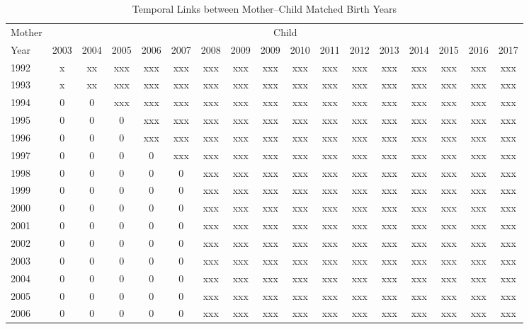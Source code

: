 \documentclass[11pt]{article}
\begin{document}
\begin{spacing}{1.5}
\begin{appendices}
    
  \begin{landscape}
  \begin{table}[htpb!]
    \centering
    \caption{Temporal Links between Mother--Child Matched Birth Years}
    \label{tab:birthChart}
    \begin{tabular}{lcccccccccccccccc} \toprule
    Mother & \multicolumn{16}{c}{Child} \\ \cmidrule(r){2-17}
    Year & 2003 & 2004 & 2005 & 2006 & 2007 & 2008 & 2009 & 2009 & 2010 & 2011 & 2012 & 2013 & 2014 & 2015 & 2016 & 2017 \\ \midrule
    1992 & x & xx & xxx & xxx & xxx & xxx & xxx & xxx & xxx & xxx & xxx & xxx & xxx & xxx & xxx & xxx \\
    1993 & x & xx & xxx & xxx & xxx & xxx & xxx & xxx & xxx & xxx & xxx & xxx & xxx & xxx & xxx & xxx \\
    1994 & 0 & 0  & xxx & xxx & xxx & xxx & xxx & xxx & xxx & xxx & xxx & xxx & xxx & xxx & xxx & xxx \\
    1995 & 0 & 0  & 0   & xxx & xxx & xxx & xxx & xxx & xxx & xxx & xxx & xxx & xxx & xxx & xxx & xxx \\
    1996 & 0 & 0  & 0   & xxx & xxx & xxx & xxx & xxx & xxx & xxx & xxx & xxx & xxx & xxx & xxx & xxx \\
    1997 & 0 & 0  & 0   & 0   & xxx & xxx & xxx & xxx & xxx & xxx & xxx & xxx & xxx & xxx & xxx & xxx \\
    1998 & 0 & 0  & 0   & 0   & 0   & xxx & xxx & xxx & xxx & xxx & xxx & xxx & xxx & xxx & xxx & xxx \\
    1999 & 0 & 0  & 0   & 0   & 0   & xxx & xxx & xxx & xxx & xxx & xxx & xxx & xxx & xxx & xxx & xxx \\
    2000 & 0 & 0  & 0   & 0   & 0   & xxx & xxx & xxx & xxx & xxx & xxx & xxx & xxx & xxx & xxx & xxx \\
    2001 & 0 & 0  & 0   & 0   & 0   & xxx & xxx & xxx & xxx & xxx & xxx & xxx & xxx & xxx & xxx & xxx \\
    2002 & 0 & 0  & 0   & 0   & 0   & xxx & xxx & xxx & xxx & xxx & xxx & xxx & xxx & xxx & xxx & xxx \\
    2003 & 0 & 0  & 0   & 0   & 0   & xxx & xxx & xxx & xxx & xxx & xxx & xxx & xxx & xxx & xxx & xxx \\
    2004 & 0 & 0  & 0   & 0   & 0   & xxx & xxx & xxx & xxx & xxx & xxx & xxx & xxx & xxx & xxx & xxx \\
    2005 & 0 & 0  & 0   & 0   & 0   & xxx & xxx & xxx & xxx & xxx & xxx & xxx & xxx & xxx & xxx & xxx \\
    2006 & 0 & 0  & 0   & 0   & 0   & xxx & xxx & xxx & xxx & xxx & xxx & xxx & xxx & xxx & xxx & xxx \\
    \bottomrule
    \end{tabular}
  \end{table}
  \end{landscape}



\end{appendices}
\end{spacing}
\end{document}

